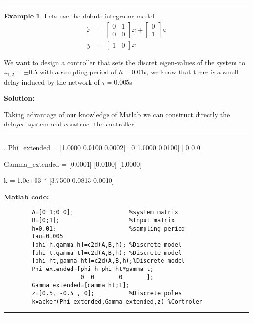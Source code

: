 \documentclass[nols]{tufte-handout}
\theoremstyle{definition}
\newtheorem{exmp}{Example}[section]
\begin{document}

\vspace{1cm}
\hrule height 1pt
\begin{exmp}


Lets use the dobule integrator model
\begin{align*}
\dot{x}
&=
\begin{bmatrix}
0 & 1\\
0 & 0
\end{bmatrix}
x+
\begin{bmatrix}
0\\
1
\end{bmatrix}
u\\
y&=
\begin{bmatrix}
1 & 0
\end{bmatrix}
x
\end{align*}

We want to design a controller that sets the discret eigen-values of the system to $z_{1,2}=\pm 0.5$ with a sampling period of $h=0.01$s, we know that there is a small delay induced by the network of $\tau=0.005$s 

    \textbf{Solution:}

Taking advantage of our knowledge of Matlab we can construct directly the delayed system and construct the controller

    \noindent\hfil\rule{\textwidth}{.4pt}\hfil
       \begin{verbbox}[\footnotesize]
                                                            .           
Phi_extended =
[1.0000    0.0100    0.0002]
[     0    1.0000    0.0100]
[     0         0         0]

Gamma_extended =
[0.0001]
[0.0100]
[1.0000]

k =
1.0e+03 *
[3.7500    0.0813    0.0010]

    \end{verbbox} 
\textbf{Matlab code:}
    \begin{verbatim}
        A=[0 1;0 0];                %system matrix
        B=[0;1];                    %Input matrix
        h=0.01;                     %sampling period
        tau=0.005
        [phi_h,gamma_h]=c2d(A,B,h); %Discrete model
        [phi_t,gamma_t]=c2d(A,B,h); %Discrete model
        [phi_ht,gamma_ht]=c2d(A,B,h);%Discrete model
        Phi_extended=[phi_h phi_ht*gamma_t;
                      0  0       0       ];
        Gamma_extended=[gamma_ht;1];
        z=[0.5, -0.5 , 0];          %Discrete poles
        k=acker(Phi_extended,Gamma_extended,z) %Controler
    \end{verbatim}


    \noindent\hfil\rule{\textwidth}{.4pt}\hfil

\hrule height 1pt
\end{exmp}
\vspace{1cm}
\end{document}
